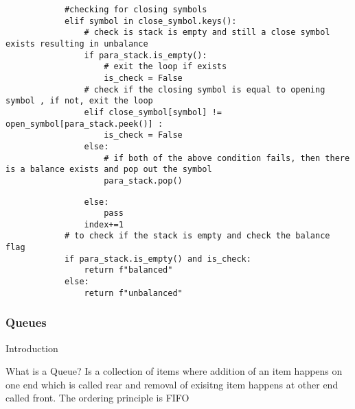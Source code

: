 \documentclass{beamer}
\begin{document}
\begin{frame}[fragile]    
    \begin{lstlisting}
            #checking for closing symbols
            elif symbol in close_symbol.keys():
                # check is stack is empty and still a close symbol exists resulting in unbalance
                if para_stack.is_empty():
                    # exit the loop if exists
                    is_check = False
                # check if the closing symbol is equal to opening symbol , if not, exit the loop
                elif close_symbol[symbol] != open_symbol[para_stack.peek()] :
                    is_check = False 
                else:
                    # if both of the above condition fails, then there is a balance exists and pop out the symbol
                    para_stack.pop()
    \end{lstlisting}
\end{frame}
    
\begin{frame}[fragile]
    \begin{lstlisting}
                else:
                    pass
                index+=1
            # to check if the stack is empty and check the balance flag 
            if para_stack.is_empty() and is_check:
                return f"balanced"
            else:
                return f"unbalanced"

    \end{lstlisting}
\end{frame}
\subsubsection{Queues}
\begin{frame}{Introduction}
    \begin{alertblock}{What is a Queue?}
        Is a collection of items where addition of an item happens on one end which is called \alert{rear} and removal of exisitng item happens at other end called \alert{front}. The ordering principle is \alert{FIFO}
        
    \end{alertblock}
\end{frame}
\end{document}
